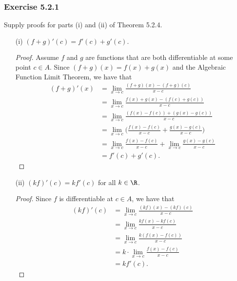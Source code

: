 \subsubsection{Exercise 5.2.1} Supply proofs for parts (i) and (ii) of Theorem 5.2.4.
\begin{enumerate}
    \item[(i)] \( (f+g)'(c) = f'(c) + g'(c)  \).
        \begin{proof}
        Assume \( f  \) and \( g  \) are functions that are both differentiable at some point \( c \in A  \). Since \( (f+g)(x) = f(x) + g(x)  \) and the Algebraic Function Limit Theorem, we have that
        \begin{align*}
            (f+g)'(x) &= \lim_{ x \to c } \frac{ (f+g)(x) - (f+g)(c) }{ x - c  }  \\
                      &= \lim_{ x \to c } \frac{ f(x) + g(x) - (f(c) + g(c) ) }{ x - c  } \\
                      &= \lim_{ x \to c  } \frac{ ( f(x) - f(c)) + (g(x) - g(c)) }{ x - c  } \\
                      &= \lim_{ x \to c  } \Big(  \frac{ f(x) - f(c)  }{ x - c  } + \frac{ g(x) - g(c)   }{ x - c  }  \Big) \\
                      &= \lim_{ x \to c  }  \frac{ f(x) - f(c)  }{ x - c  } + \lim_{ x \to c  } \frac{ g(x) - g(c)  }{ x - c  } \\
                      &= f'(c) + g'(c).
        \end{align*}
        \end{proof}
    \item[(ii)] \( (kf)'(c) = k f'(c)  \) for all \( k \in \R  \).
        \begin{proof}
        Since \( f  \) is differentiable at \( c \in A  \), we have that 
        \begin{align*}
            (kf)'(c) &= \lim_{ x \to c  } \frac{ (kf)(x) - (kf)(c)  }{ x - c  }  \\
                     &= \lim_{ x \to c  }  \frac{ k f(x) - k f(c)  }{ x - c  } \\
                     &= \lim_{ x \to c  } \frac{ k (f(x) - f(c) ) }{ x - c  } \\
                     &=k \cdot  \lim_{ x \to c  } \frac{ f(x) - f(c) }{ x - c  } \\
                     &= k f'(c).
        \end{align*}
        \end{proof}
\end{enumerate}

